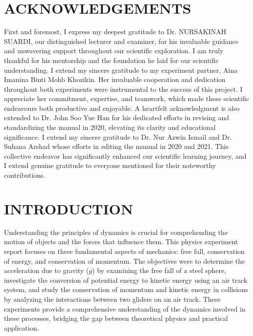\documentclass[a4paper,11pt]{article}
\begin{document}
\newpage 
{}
\section*{\large \center ACKNOWLEDGEMENTS}
\label{sec:ACKNOWLEDGEMENTS}
First and foremost, I express my deepest gratitude to Dr. NURSAKINAH SUARDI, our distinguished lecturer and examiner, for his invaluable guidance and unwavering support throughout our scientific exploration. I am truly thankful for his mentorship and the foundation he laid for our scientific understanding. I extend my sincere gratitude to my experiment partner, Aina Imanina Binti Mohb Khozikin. Her invaluable cooperation and dedication throughout both experiments were instrumental to the success of this project. I appreciate her commitment, expertise, and teamwork, which made these scientific endeavours both productive and enjoyable. A heartfelt acknowledgment is also extended to Dr. John Soo Yue Han for his dedicated efforts in revising and standardizing the manual in 2020, elevating its clarity and educational significance. I extend my sincere gratitude to Dr. Nur Azwin Ismail and Dr. Suhana Arshad whose efforts in editing the manual in 2020 and 2021. This collective endeavor has significantly enhanced our scientific learning journey, and I extend genuine gratitude to everyone mentioned for their noteworthy contributions.

\newpage
\renewcommand{\contentsname}{\centering CONTENTS}
\renewcommand{\cftsecleader}{\cftdotfill{\cftdotsep}} %
\renewcommand{\cftdotsep}{1.0} %
\tableofcontents
{}
{}
\label{sec:CONTENTS}

\newpage
{}
{}
\label{sec:LIST OF TABLES}
\listoftables

\newpage
{}
{}
\label{sec:LIST OF FIGURES}
\listoffigures

\newpage
{}
\section*{\center INTRODUCTION}
\label{sec:INTRODUCTION}
Understanding the principles of dynamics is crucial for comprehending the motion of objects and the forces that influence them. This physics experiment report focuses on three fundamental aspects of mechanics: free fall, conservation of energy, and conservation of momentum. The objectives were to determine the acceleration due to gravity (\(g\)) by examining the free fall of a steel sphere, investigate the conversion of potential energy to kinetic energy using an air track system, and study the conservation of momentum and kinetic energy in collisions by analyzing the interactions between two gliders on an air track. These experiments provide a comprehensive understanding of the dynamics involved in these processes, bridging the gap between theoretical physics and practical application.
\end{document}
